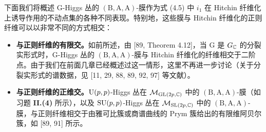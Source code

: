 
下面我们将概述 G-Higgs 丛的 $(\mathrm{B},\mathrm{A},\mathrm{A})$-膜作为式 (4.5) 中 $i_1$ 在 Hitchin 纤维化上诱导作用的不动点集的各种不同表现。特别地，这些膜与 Hitchin 纤维化的正则纤维可以以非常不同的方式相交：

\begin{itemize}[leftmargin=1.4em,itemsep=1pt,topsep=1pt]
\item \textbf{与正则纤维的有限交。}如前所述，由 [89, Theorem 4.12]，当 G 是 $G_{\mathbb{C}}$ 的分裂实形式时，G-Higgs 丛的 $(\mathrm{B},\mathrm{A},\mathrm{A})$-膜与 Hitchin 纤维化的纤维相交于二阶点。由于我们在前面几章已经概述过这一情形，这里不再进一步讨论（关于分裂实形式的谱数据，见 [11, 29, 88, 89, 92, 97] 等文献）。
\item \textbf{与正则纤维的正维交。}$\mathrm{U}(p,p)$-Higgs 丛在 $\mathcal{M}_{\mathrm{GL}(2p,\mathbb{C})}$ 中的 $(\mathrm{B},\mathrm{A},\mathrm{A})$-膜（如习题 \textbf{II.(4)} 所示），以及 $\mathrm{SU}(p,p)$-Higgs 丛在 $\mathcal{M}_{\mathrm{SL}(2p,\mathbb{C})}$ 中的 $(\mathrm{B},\mathrm{A},\mathrm{A})$-膜，与正则纤维相交于由雅可比簇或商谱曲线的 Prym 簇给出的有限维阿贝尔簇，如 [89, 91] 所示。
\end{itemize}
